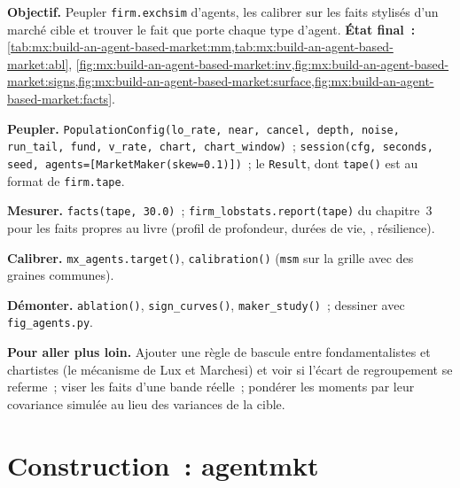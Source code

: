 \begin{tutorial}
\textbf{Objectif.} Peupler \texttt{firm.exchsim} d'agents, les calibrer sur les faits stylisés d'un marché cible et trouver le fait que porte chaque type
d'agent. \textbf{État final~:} \cref{tab:mx:build-an-agent-based-market:mm,tab:mx:build-an-agent-based-market:abl},
\cref{fig:mx:build-an-agent-based-market:inv,fig:mx:build-an-agent-based-market:signs,fig:mx:build-an-agent-based-market:surface,fig:mx:build-an-agent-based-market:facts}.
\begin{tutsteps}
\item \textbf{Peupler.} \texttt{PopulationConfig(lo\_rate, near, cancel, depth, noise, run\_tail, fund, v\_rate, chart, chart\_window)}~;
\texttt{session(cfg, seconds, seed, agents=[MarketMaker(skew=0.1)])}~; le \texttt{Result}, dont \texttt{tape()} est au format de \texttt{firm.tape}.
\item \textbf{Mesurer.} \texttt{facts(tape, 30.0)}~; \texttt{firm\_lobstats.report(tape)} du chapitre~3 pour les faits propres au livre (profil de profondeur,
durées de vie, , résilience).
\item \textbf{Calibrer.} \texttt{mx\_agents.target()}, \texttt{calibration()} (\texttt{msm} sur la grille avec des graines communes).
\item \textbf{Démonter.} \texttt{ablation()}, \texttt{sign\_curves()}, \texttt{maker\_study()}~; dessiner avec \texttt{fig\_agents.py}.
\end{tutsteps}
\textbf{Pour aller plus loin.} Ajouter une règle de bascule entre fondamentalistes et chartistes (le mécanisme de Lux et Marchesi) et voir si l'écart de regroupement
se referme~; viser les faits d'une bande réelle~; pondérer les moments par leur covariance simulée au lieu des variances de la cible.
\end{tutorial}

\section{Construction~: agentmkt}\label{bld:mx:build-an-agent-based-market:agentmkt}

